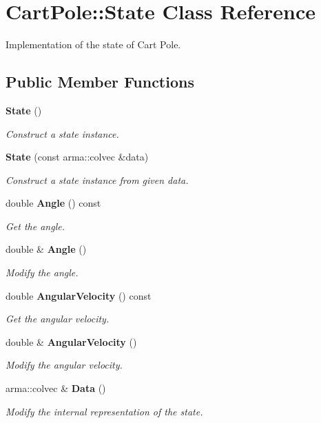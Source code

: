 \section{Cart\+Pole\+:\+:State Class Reference}
\label{classmlpack_1_1rl_1_1CartPole_1_1State}


Implementation of the state of Cart Pole.  


\subsection*{Public Member Functions}
\begin{DoxyCompactItemize}
\item 
\textbf{ State} ()
\begin{DoxyCompactList}\small\item\em Construct a state instance. \end{DoxyCompactList}\item 
\textbf{ State} (const arma\+::colvec \&data)
\begin{DoxyCompactList}\small\item\em Construct a state instance from given data. \end{DoxyCompactList}\item 
double \textbf{ Angle} () const
\begin{DoxyCompactList}\small\item\em Get the angle. \end{DoxyCompactList}\item 
double \& \textbf{ Angle} ()
\begin{DoxyCompactList}\small\item\em Modify the angle. \end{DoxyCompactList}\item 
double \textbf{ Angular\+Velocity} () const
\begin{DoxyCompactList}\small\item\em Get the angular velocity. \end{DoxyCompactList}\item 
double \& \textbf{ Angular\+Velocity} ()
\begin{DoxyCompactList}\small\item\em Modify the angular velocity. \end{DoxyCompactList}\item 
arma\+::colvec \& \textbf{ Data} ()
\begin{DoxyCompactList}\small\item\em Modify the internal representation of the state. \end{DoxyCompactList}\item 

\end{DoxyCompactItemize}
